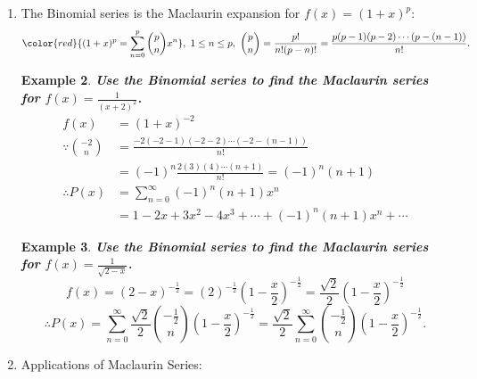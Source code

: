 \documentclass[12pt, a4paper]{article}
\newtheorem{example}{Example}[subsection]
\begin{document}
\begin{enumerate}
\begin{example}
\begin{center}
\begin{tabular}{c|c}
            $f'''(x)=-6(2+x)^{-4}$&$f'''(0)=-6(2)^{-4}=-6\times\frac{1}{16}$\\
            $f^{(4)}(x)=24(2+x)^{-5}$&$f^{(4)}(0)=24(2)^{-5}=24\times\frac{1}{32}$
        \end{tabular}\end{center}
        $$\begin{aligned}
            P(x)&=\frac{1}{2}+\frac{-\frac{1}{4}}{1!}x+\frac{2\times\frac{1}{8}}{2!}x^2+\frac{-6\times\frac{1}{16}}{3!}x^3+\frac{24(2)^{-5}=24\times\frac{1}{32}}{4!}x^4+\cdots\\
            &=\sum_{n=0}^\infty\left(\frac{1}{2}\right)^{n+1}(-x)^n.
        \end{aligned}$$
    \end{example}
    \item The Binomial series is the Maclaurin expansion for $f(x)=(1+x)^p$: 
    $${\color{red}{(1+x)^p=\sum_{n=0}^p\binom{p}{n}x^n}},\ 1\leq n\leq p,\ \binom{p}{n}=\frac{p!}{n!(p-n)!}=\frac{p(p-1)(p-2)\cdots(p-(n-1))}{n!}.$$
    \begin{example}
        \textbf{Use the Binomial series to find the Maclaurin series for $f(x)=\frac{1}{(x+2)^2}$.}
        $$\begin{aligned}
            f(x)&=(1+x)^{-2}\\
            \because \binom{-2}{n}&=\frac{-2(-2-1)(-2-2)\cdots(-2-(n-1))}{n!}\\
            &=(-1)^n\frac{2(3)(4)\cdots(n+1)}{n!}=(-1)^n(n+1)\\
            \therefore P(x)&=\sum_{n=0}^\infty(-1)^n(n+1)x^n\\
            &=1-2x+3x^2-4x^3+\cdots+(-1)^n(n+1)x^n+\cdots
        \end{aligned}$$
    \end{example}
    \begin{example}
        \textbf{Use the Binomial series to find the Maclaurin series for $f(x)=\frac{1}{\sqrt{2-x}}$.}
            $$f(x)=(2-x)^{-\frac{1}{2}}=(2)^{-\frac{1}{2}}\left(1-\frac{x}{2}\right)^{-\frac{1}{2}}=\frac{\sqrt{2}}{2}\left(1-\frac{x}{2}\right)^{-\frac{1}{2}}$$
            $$\therefore P(x)=\sum_{n=0}^\infty\frac{\sqrt{2}}{2}\binom{-\frac{1}{2}}{n}\left(1-\frac{x}{2}\right)^{-\frac{1}{2}}=\frac{\sqrt{2}}{2}\sum_{n=0}^\infty\binom{-\frac{1}{2}}{n}\left(1-\frac{x}{2}\right)^{-\frac{1}{2}}.$$
    \end{example}
    \item Applications of Maclaurin Series: 
    \begin{itemize}

\end{itemize}
\end{enumerate}
\end{document}
